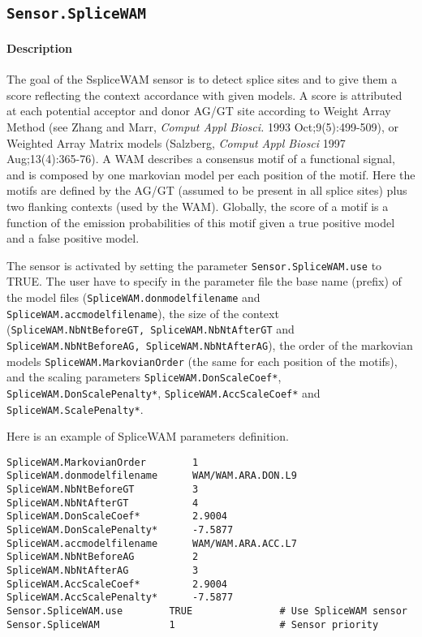 
\subsection{\texttt{Sensor.SpliceWAM}}

\paragraph{Description}

The goal of the SspliceWAM sensor is to detect splice sites and to
give them a score reflecting the context accordance with given
models. A score is attributed at each potential acceptor and donor
AG/GT site according to Weight Array Method (see Zhang and Marr, {\em
Comput Appl Biosci.} 1993 Oct;9(5):499-509), or Weighted Array Matrix
models (Salzberg, {\em Comput Appl Biosci} 1997 Aug;13(4):365-76). A
WAM describes a consensus motif of a functional signal, and is
composed by one markovian model per each position of the motif. Here
the motifs are defined by the AG/GT (assumed to be present in all
splice sites) plus two flanking contexts (used by the WAM).  Globally,
the score of a motif is a function of the emission probabilities of
this motif given a true positive model and a false positive model.

The sensor is activated by setting the parameter
\texttt{Sensor.SpliceWAM.use} to TRUE.  The user have to specify in
the parameter file the base name (prefix) of the model files
(\texttt{SpliceWAM.donmodelfilename} and
\texttt{SpliceWAM.accmodelfilename}), the size of the context
(\texttt{SpliceWAM.NbNtBeforeGT, SpliceWAM.NbNtAfterGT} and
\texttt{SpliceWAM.NbNtBeforeAG, SpliceWAM.NbNtAfterAG}), the order of
the markovian models \texttt{SpliceWAM.MarkovianOrder} (the same for
each position of the motifs), and the scaling parameters
\texttt{SpliceWAM.DonScaleCoef*}, \texttt{SpliceWAM.DonScalePenalty*},
\texttt{SpliceWAM.AccScaleCoef*} and \texttt{SpliceWAM.ScalePenalty*}.

Here is an example of SpliceWAM parameters definition.
\begin{Verbatim}[fontsize=\small]
SpliceWAM.MarkovianOrder        1
SpliceWAM.donmodelfilename      WAM/WAM.ARA.DON.L9
SpliceWAM.NbNtBeforeGT          3
SpliceWAM.NbNtAfterGT           4
SpliceWAM.DonScaleCoef*         2.9004
SpliceWAM.DonScalePenalty*      -7.5877
SpliceWAM.accmodelfilename      WAM/WAM.ARA.ACC.L7
SpliceWAM.NbNtBeforeAG          2
SpliceWAM.NbNtAfterAG           3
SpliceWAM.AccScaleCoef*         2.9004
SpliceWAM.AccScalePenalty*      -7.5877
Sensor.SpliceWAM.use        TRUE               # Use SpliceWAM sensor
Sensor.SpliceWAM            1                  # Sensor priority
\end{Verbatim}

